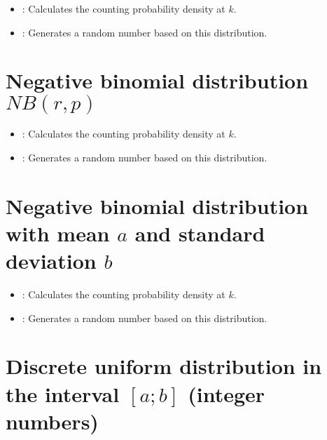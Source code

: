 \begin{itemize}

\item
{}:
Calculates the counting probability density at $k$.

\item
{}:
Generates a random number based on this distribution.

\end{itemize}



\section{Negative binomial distribution \texorpdfstring{$NB(r,p)$}{NB(r,p)}}

\begin{itemize}

\item
{}:
Calculates the counting probability density at $k$.

\item
{}:
Generates a random number based on this distribution.

\end{itemize}



\section{Negative binomial distribution with mean \texorpdfstring{$a$}{a} and standard deviation \texorpdfstring{$b$}{b}}

\begin{itemize}

\item
{}:
Calculates the counting probability density at $k$.

\item
{}:
Generates a random number based on this distribution.

\end{itemize}



\section{Discrete uniform distribution in the interval \texorpdfstring{$[a;b]$}{[a;b]} (integer numbers)}

